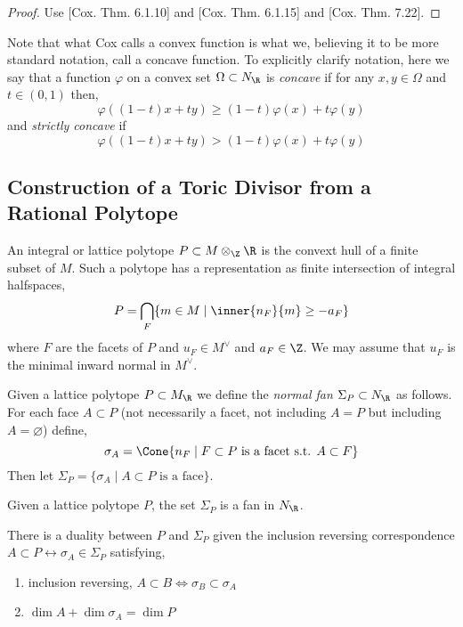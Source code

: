 \begin{proof}
Use [Cox. Thm. 6.1.10] and [Cox. Thm. 6.1.15] and [Cox. Thm. 7.22].
\end{proof}

\begin{rmk}
Note that what Cox calls a convex function is what we, believing it to be more standard notation, call a concave function. To explicitly clarify notation, here we say that a function $\varphi$ on a convex set $\Omega \subset N_\R$ is \textit{concave} if for any $x, y \in \Omega$ and $t \in (0, 1)$ then,
\[ \varphi((1 - t) x + t y) \ge (1 - t) \varphi(x) + t \varphi(y) \]
and \textit{strictly concave} if 
\[ \varphi((1 - t) x + t y) > (1 - t) \varphi(x) + t \varphi(y) \]
\end{rmk}

\subsection{Construction of a Toric Divisor from a Rational Polytope}

\begin{definition}
An integral or lattice polytope $P \subset M \otimes_\Z \R$ is the convext hull of a finite subset of $M$. Such a polytope has a representation as finite intersection of integral halfspaces,
\[ P = \bigcap_F \{ m \in M \mid \inner{n_F}{m} \ge - a_F \} \]
where $F$ are the facets of $P$ and $u_F \in M^\vee$ and $a_F \in \Z$. We may assume that $u_F$ is the minimal inward normal in $M^\vee$.
\end{definition}

\begin{definition}
Given a lattice polytope $P \subset M_\R$ we define the \textit{normal fan} $\Sigma_P \subset N_\R$ as follows. For each face $A \subset P$ (not necessarily a facet, not including $A = P$ but including $A = \varnothing$) define,
\[ \sigma_A = \Cone{ n_F \mid F \subset P \text{ is a facet s.t. } A \subset F } \]
Then let $\Sigma_P = \{ \sigma_A \mid A \subset P \text{ is a face} \}$.
\end{definition}

\begin{proposition}
Given a lattice polytope $P$, the set $\Sigma_P$ is a fan in $N_\R$.
\end{proposition}

\begin{proposition}
There is a duality between $P$ and $\Sigma_P$ given the inclusion reversing correspondence $A \subset P \leftrightarrow \sigma_A \in \Sigma_P$ satisfying,
\begin{enumerate}
\item inclusion reversing, $A \subset B \iff \sigma_B \subset \sigma_A$
\item $\dim{A} + \dim{\sigma_A} = \dim{P}$
\end{enumerate}
\end{proposition}

